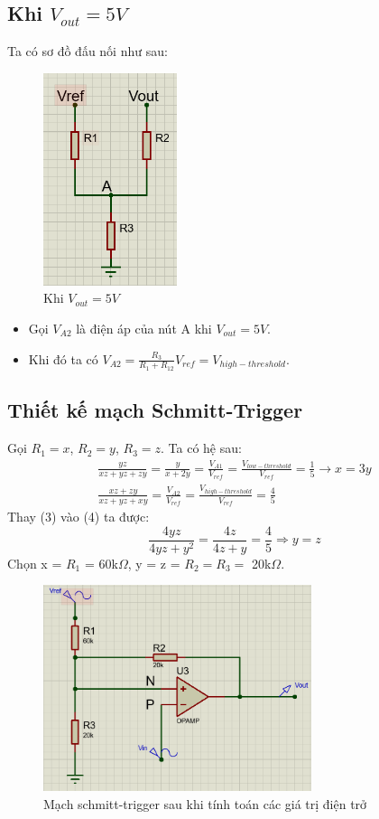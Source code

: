\subsection{Khi $V_{out} = 5V$}
Ta có sơ đồ đấu nối như sau:
\begin{figure}[H]
    \centering
    \includegraphics[width=0.35\textwidth]{pictures/topic3_b.png}
    \caption{Khi $V_{out} = 5V$}
\end{figure}
\begin{itemize}
    \item Gọi $V_{A2}$ là điện áp của nút A khi $V_{out} = 5V$.
    \item Khi đó ta có $V_{A2} = \frac{R_3}{R_1+R_{12}}V_{ref} = V_{high-threshold}$.
\end{itemize}
    \subsection{Thiết kế mạch Schmitt-Trigger}
Gọi $R_1 = x$, $R_2 = y$, $R_3 = z$.
Ta có hệ sau:
\begin{align}
\frac{yz}{xz+yz+zy} = \frac{y}{x+2y} = \frac{V_{A1}}{V_{ref}} = \frac{V_{low-threshold}}{V_{ref}} = \frac{1}{5} 
    \rightarrow x = 3y \\
    \frac{xz+zy}{xz+yz+xy} = \frac{V_{A2}}{V_{ref}} = \frac{V_{high-threshold}}{V_{ref}} = \frac{4}{5}
\end{align}
Thay (3) vào (4) ta được:
\[
\frac{4yz}{4yz + y^2} = \frac{4z}{4z+y} = \frac{4}{5} \Rightarrow y = z
\]
Chọn x = $R_1$ = 60k$\Omega$, y = z = $R_2 = R_3 =$ 20k$\Omega$.\\
\begin{figure}[H]
    \centering
    \includegraphics[width=0.7\textwidth]{pictures/result3_a}
    \caption{Mạch schmitt-trigger sau khi tính toán các giá trị điện trở}
\end{figure}
